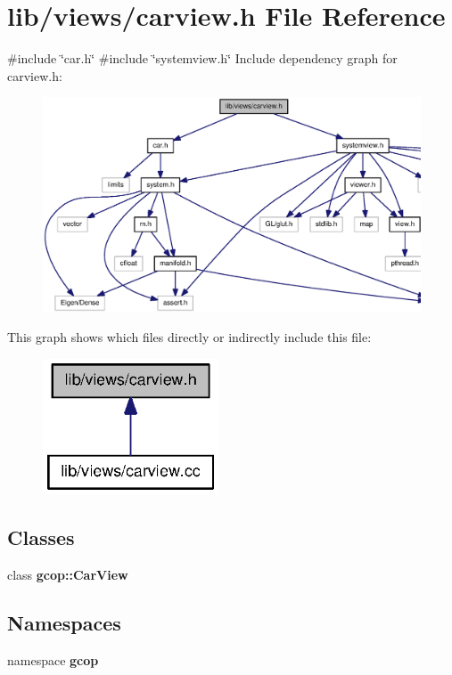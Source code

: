 \section{lib/views/carview.h \-File \-Reference}
\label{carview_8h}
{\ttfamily \#include \char`\"{}car.\-h\char`\"{}}\*
{\ttfamily \#include \char`\"{}systemview.\-h\char`\"{}}\*
\-Include dependency graph for carview.\-h\-:
\nopagebreak
\begin{figure}[H]
\begin{center}
\leavevmode
\includegraphics[width=350pt]{carview_8h__incl}
\end{center}
\end{figure}
\-This graph shows which files directly or indirectly include this file\-:
\nopagebreak
\begin{figure}[H]
\begin{center}
\leavevmode
\includegraphics[width=148pt]{carview_8h__dep__incl}
\end{center}
\end{figure}
\subsection*{\-Classes}
\begin{DoxyCompactItemize}
\item 
class {\bf gcop\-::\-Car\-View}
\end{DoxyCompactItemize}
\subsection*{\-Namespaces}
\begin{DoxyCompactItemize}
\item 
namespace {\bf gcop}
\end{DoxyCompactItemize}
